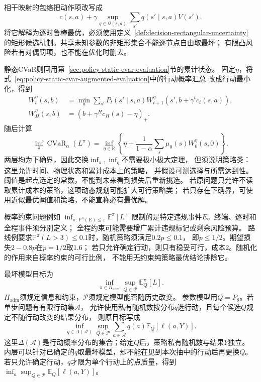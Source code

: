 相干映射的包络把动作项改写成
\[
  c(s,a)+\gamma\sup_{q\in\mathcal Q(s,a)}
    \sum_{s'}q(s'\mid s,a)V(s').
\]
将它解释为逐时鲁棒最优，必须使用定义~\ref{def:decision-rectangular-uncertainty}
的矩形候选机制。共享未知参数的非矩形集合不能逐节点自由取最坏；
有限凸风险若有对偶罚项，也不能在优化时删去。

静态CVaR则回用第~\ref{sec:policy-static-cvar-evaluation}节的累计状态。
固定$\eta$，将式~\eqref{eq:policy-static-cvar-augmented-evaluation}中的行动概率汇总
改成行动最小化，得到
\[
  \begin{aligned}
    W_t^\eta(s,b)&=\min_a\sum_{s'}P_t(s'\mid s,a)
      W_{t+1}^\eta(s',b+\gamma^tc_t(s,a)),\\
    W_H^\eta(s,b)&=(b+\gamma^Hc_H(s)-\eta)_+.
  \end{aligned}
\]
随后计算
\[
  \inf_\pi\operatorname{CVaR}_\alpha(L^\pi)
  =\inf_{\eta\in\mathbb R}
    \left\{\eta+\frac{1}{1-\alpha}
      \sum_s\mu_0(s)W_0^\eta(s,0)\right\}.
\]
两层均为下确界，因此交换$\inf_\pi,\inf_\eta$不需要极小极大定理，
但须说明策略类：这里允许时间、物理状态和累计成本上的策略，
并假设可测选择与所需达到性。阈值是起点选定的常数，不能到未来看到损失后重新挑选。
若原问题只允许不读取累计成本的策略，这项动态规划可能扩大可行策略类；
若只存在下确界，可使用近似最优阈值和策略，不能宣称必有最优解。

概率约束问题例如
$\inf_{\pi:\,\mathbb P^\pi(E)\leq\varepsilon}\mathbb E^\pi[L]$
限制的是特定违规事件$E$。终端、逐时和全程事件须分别定义；
全程约束可能需要增广累计违规标记或剩余风险预算。
路线例要求$\mathbb P^\pi(L>3)\leq0.1$时，随机策略须满足$0.2p\leq0.1$，
即$p\leq1/2$。期望损失$2-0.8p$在$p=1/2$取$1.6$；
若只允许确定行动，则只有稳妥可行，成本$2$。随机化的作用来自概率约束的可行比例，
不能用无约束纯策略最优结论排除它。

最坏模型目标为
\[
  \inf_{\pi\in\Pi_{\mathrm{adm}}}
    \sup_{Q\in\mathcal P}\mathbb E_Q^\pi[L].
\]
$\Pi_{\mathrm{adm}}$须规定信息和约束，$\mathcal P$须规定模型能否随历史改变。
参数模型用$Q=P_\theta$。若单步问题有有限行动集$\mathcal A$，
允许使用私有随机数按分布$q$选行动，且每个候选$Q$规定不随行动改变的结果分布，
则原目标写成
\[
  \inf_{q\in\Delta(\mathcal A)}\sup_{Q\in\mathcal P}
    \sum_{a\in\mathcal A}q(a)\mathbb E_Q[\ell(a,Y)].
\]
这里$\Delta(\mathcal A)$是行动概率分布的集合；给定$Q$后，策略私有随机数与结果$Y$独立。
内层可以针对已确定的$q$取最坏模型，却不能在见到本次抽中的行动后再更换$Q$。
若只允许确定行动，$q$才限为单个行动上的点质量，得到
$\inf_a\sup_{Q\in\mathcal P}\mathbb E_Q[\ell(a,Y)]$。

